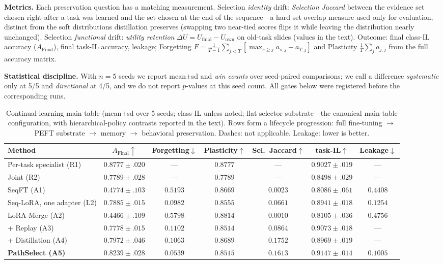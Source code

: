 \documentclass{article}
\begin{document}
\textbf{Metrics.} Each preservation question has a matching measurement. Selection \emph{identity} drift: \emph{Selection Jaccard} between the evidence set chosen right after a task was learned and the set chosen at the end of the sequence---a hard set-overlap measure used only for evaluation, distinct from the soft distributions distillation preserves (swapping two near-tied scores flips it while leaving the distribution nearly unchanged). Selection \emph{functional} drift: \emph{utility retention} $\Delta U = U_{\mathrm{final}} - U_{\mathrm{own}}$ on old-task slides (values in the text). Outcome: final class-IL accuracy ($A_{\mathrm{Final}}$), final task-IL accuracy, leakage; Forgetting $F = \frac{1}{T-1}\sum_{j<T}[\max_{s\ge j} a_{s,j} - a_{T,j}]$ and Plasticity $\frac{1}{T}\sum_j a_{j,j}$ from the full accuracy matrix.

\textbf{Statistical discipline.} With $n{=}5$ seeds we report mean$\pm$sd and \emph{win counts} over seed-paired comparisons; we call a difference \emph{systematic} only at 5/5 and \emph{directional} at 4/5, and we do not report $p$-values at this seed count. All gates below were registered before the corresponding runs.

\begin{table}[t]
\centering\footnotesize
\caption{Continual-learning main table (mean$\pm$sd over 5 seeds; class-IL unless noted; flat selector substrate---the canonical main-table configuration, with hierarchical-policy contrasts reported in the text). Rows form a lifecycle progression: full fine-tuning $\to$ PEFT substrate $\to$ memory $\to$ behavioral preservation. Dashes: not applicable. Leakage: lower is better.}
\label{tab:main}
\begin{tabular}{lcccccc}
\toprule
Method & $A_{\mathrm{Final}}\!\uparrow$ & Forgetting$\downarrow$ & Plasticity$\uparrow$ & Sel.\ Jaccard$\uparrow$ & task-IL$\uparrow$ & Leakage$\downarrow$ \\
\midrule
Per-task specialist (R1) & $0.8777{\pm}.020$ & --- & $0.8777$ & --- & $0.9027{\pm}.019$ & --- \\
Joint (R2) & $0.7789{\pm}.028$ & --- & $0.7789$ & --- & $0.8498{\pm}.029$ & --- \\
\midrule
SeqFT (A1) & $0.4774{\pm}.103$ & $0.5193$ & $0.8669$ & $0.0023$ & $0.8086{\pm}.061$ & $0.4408$ \\
Seq-LoRA, one adapter (L2) & $0.7885{\pm}.015$ & $0.0982$ & $0.8555$ & $0.0661$ & $0.8941{\pm}.018$ & $0.1254$ \\
LoRA-Merge (A2) & $0.4466{\pm}.109$ & $0.5798$ & $0.8814$ & $0.0010$ & $0.8105{\pm}.036$ & $0.4756$ \\
\;+ Replay (A3) & $0.7778{\pm}.015$ & $0.1102$ & $0.8514$ & $0.0864$ & $0.9073{\pm}.018$ & --- \\
\;+ Distillation (A4) & $0.7972{\pm}.046$ & $0.1063$ & $0.8689$ & $0.1752$ & $0.8969{\pm}.019$ & --- \\
\textbf{PathSelect (A5)} & $\mathbf{0.8239{\pm}.028}$ & $\mathbf{0.0539}$ & $0.8515$ & $0.1613$ & $\mathbf{0.9147{\pm}.014}$ & $\mathbf{0.1005}$ \\
\bottomrule
\end{tabular}
\end{table}
\end{document}
